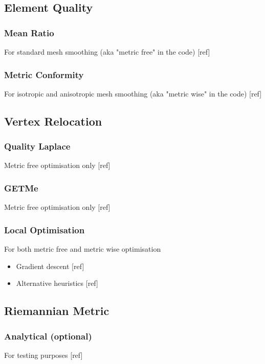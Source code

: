 \documentclass[preprint,12pt]{elsarticle}
\begin{document}
\subsection{Element Quality}
\label{}

\subsubsection{Mean Ratio}
\label{}
For standard mesh smoothing (aka "metric free" in the code)
[ref]

\subsubsection{Metric Conformity}
\label{}
For isotropic and anisotropic mesh smoothing (aka "metric wise" in the code)
[ref]


\subsection{Vertex Relocation}
\label{}

\subsubsection{Quality Laplace}
\label{}
Metric free optimisation only
[ref]

\subsubsection{GETMe}
\label{}
Metric free optimisation only
[ref]

\subsubsection{Local Optimisation}
\label{}
For both metric free and metric wise optimisation
\begin{itemize}
\item Gradient descent 
[ref]
\item Alternative heuristics
[ref]
\end{itemize}


\subsection{Riemannian Metric}
\label{}

\subsubsection{Analytical (optional)}
\label{}
For testing purposes
[ref]
\end{document}
